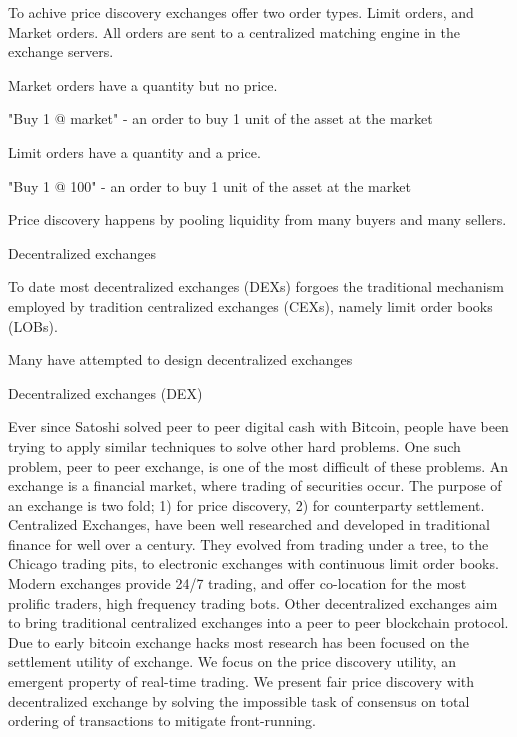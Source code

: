 \documentclass[12pt]{article}
\begin{document}
To achive price discovery exchanges offer two order types. Limit orders, and Market orders. All orders are sent to a centralized matching engine in the exchange servers. 


Market orders have a quantity but no price. 

\begin{enumerate*}
    \item "Buy 1 @ market" - an order to buy 1 unit of the asset at the market  
\end{enumerate*}

Limit orders have a quantity and a price. 

\begin{enumerate*}
    \item "Buy 1 @ 100" - an order to buy 1 unit of the asset at the market  
\end{enumerate*}



Price discovery happens by pooling liquidity from many buyers and many sellers. 

Decentralized exchanges 


To date most decentralized exchanges (DEXs) forgoes the traditional mechanism employed by tradition centralized exchanges (CEXs), namely limit order books (LOBs).  

Many have attempted to design decentralized exchanges 




Decentralized exchanges (DEX) 




    Ever  since  Satoshi  solved  peer  to  peer  digital  cash  with  Bitcoin,  people have  been  trying  to  apply  similar  techniques  to  solve  other  hard  problems. One such problem, peer to peer exchange, is one of the most difficult of these problems. An exchange is a financial market, where trading of securities occur. The purpose of an exchange is two fold;  1) for price discovery, 2) for counterparty settlement. Centralized Exchanges, have been well researched and developed in traditional finance for well over a century.  They evolved from trading under a tree, to the Chicago trading pits, to electronic exchanges with continuous limit order books. Modern exchanges provide 24/7 trading, and offer co-location for the most prolific traders, high frequency trading bots. Other decentralized exchanges aim to bring traditional centralized exchanges into a peer to peer blockchain protocol. Due to early bitcoin exchange hacks most research has been focused on the settlement utility of exchange. We focus on the price discovery utility, an emergent property of real-time trading. We present fair price discovery with decentralized exchange by solving the impossible task of consensus on total ordering of transactions to mitigate front-running.
\end{document}
